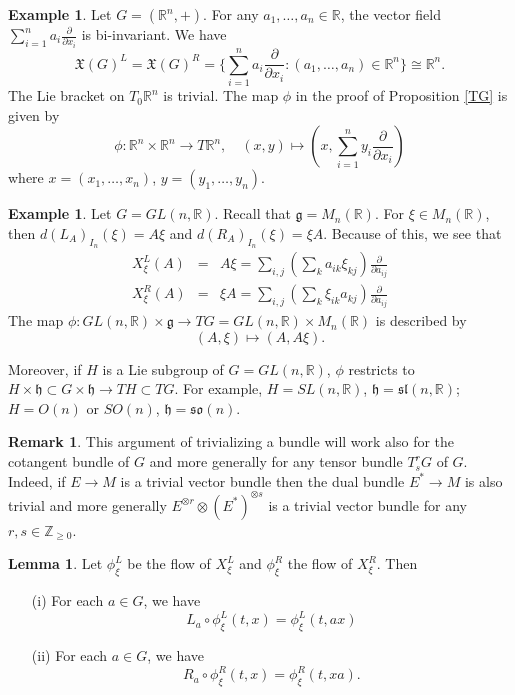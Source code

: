 \documentclass{amsart}
\numberwithin{equation}{section}
\newcommand{\bR}{\mathbb{R}}
\newcommand{\bZ}{\mathbb{Z}}
\theoremstyle{definition}
\newtheorem{example}[definition]{Example}
\newtheorem{remark}[definition]{Remark}
\theoremstyle{theorem}
\newtheorem{lemma}[definition]{Lemma}
\begin{document}
\begin{example}
Let $G = (\bR^n, +)$. For any $a_1,\ldots, a_n\in \bR$, the vector field 
$\sum_{i=1}^n a_i\frac{\partial }{\partial x_i}$ is bi-invariant. We have
$$
\mathfrak{X}(G)^L = \mathfrak{X}(G)^R = \{ \sum_{i=1}^n a_i \frac{\partial}{\partial x_i}: (a_1,\ldots, a_n)\in \bR^n\} \cong \bR^n.
$$
The Lie bracket on $T_0\bR^n$ is trivial. The map $\phi$ in the proof of Proposition \ref{TG} is given by
$$
\phi: \bR^n\times \bR^n\to T \bR^n,\quad (x,y) \mapsto (x, \sum_{i=1}^n y_i \frac{\partial}{\partial x_i})
$$
where $x=(x_1,\ldots,x_n)$, $y=(y_1,\ldots,y_n)$.
\end{example}

\begin{example}
Let $G = GL(n,\bR)$. Recall that $\mathfrak{g} = M_n(\mathbb{R})$. For $\xi \in M_n(\mathbb{R})$, then 
$d(L_A)_{I_n}(\xi) = A \xi$ and $d(R_A)_{I_n}(\xi) = \xi A$. Because of this, we see that 
\begin{eqnarray*}
X_\xi^L(A) &=&  A\xi =  \sum_{i,j} (\sum_k a_{ik} \xi_{kj}) \frac{\partial}{\partial a_{ij}}\\
X_\xi^R(A) &=&  \xi A =  \sum_{i,j}(\sum_k\xi_{ik} a_{kj}) \frac{\partial}{\partial a_{ij}}
\end{eqnarray*}
The map $\phi: GL(n,\bR) \times \mathfrak{g} \to TG = GL(n,\bR)\times M_n(\bR)$ is described by 
\[
(A, \xi) \mapsto (A, A\xi). 
\] 

Moreover, if $H$ is a Lie subgroup of $G = GL(n,\bR)$, $\phi$ restricts to
$H\times \mathfrak{h}\subset G\times \mathfrak{h}\to TH \subset TG$. For example,
$H=SL(n,\bR)$, $\mathfrak{h}=\mathfrak{sl}(n,\bR)$; $H=O(n)$ or $SO(n)$, 
$\mathfrak{h}=\mathfrak{so}(n)$. 
 \end{example}

\begin{remark}
This argument of trivializing a bundle will work also for the cotangent bundle of $G$ and more generally for any tensor bundle $T_s^rG$ of $G$. 
Indeed, if $E\to M$ is a trivial vector bundle then the dual bundle $E^*\to M$ is also trivial and more generally
$E^{\otimes r}\otimes (E^*)^{\otimes s}$ is a trivial vector bundle for any $r,s\in \bZ_{\geq 0}$.  
\end{remark}

\begin{lemma}\label{left-flow}
Let $\phi_\xi^L$ be the flow of $X_\xi^L$ and $\phi_\xi^R$ the flow of $X_\xi^R$. Then \begin{enumerate}
\item[(i)] For each $a \in G$, we have 
\[
L_a \circ \phi_\xi^L(t,x) = \phi_\xi^L(t, ax)
\]
\item[(ii)] For each $a \in G$, we have 
\[
R_a \circ \phi_\xi^R(t,x) = \phi_\xi^R(t, xa). 
\]
\end{enumerate}
\end{lemma}
\end{document}
